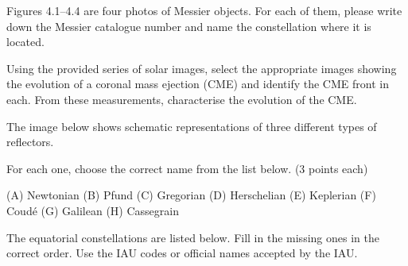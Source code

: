 
Figures 4.1--4.4 are four photos of Messier objects. For each of them, please
write down the Messier catalogue number and name the constellation where it is
located.


Using the provided series of solar images, select the appropriate images showing
the evolution of a coronal mass ejection (CME) and identify the CME front in
each. From these measurements, characterise the evolution of the CME.

The image below shows schematic representations of three different types of
reflectors.


For each one, choose the correct name from the list below. (3 points each)

(A) Newtonian \quad (B) Pfund \quad (C) Gregorian \quad (D) Herschelian \quad
(E) Keplerian \quad (F) Coud\'e \quad (G) Galilean \quad (H) Cassegrain

The equatorial constellations are listed below. Fill in the missing ones in
the correct order. Use the IAU codes or official names accepted by the IAU.

